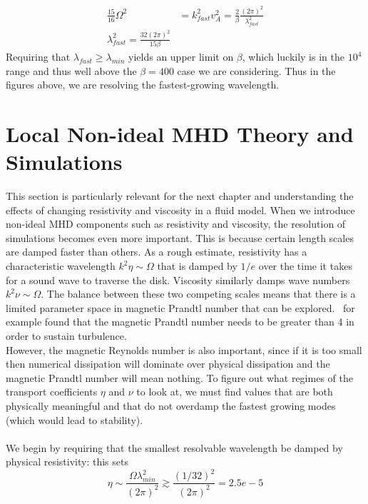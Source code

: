 \begin{align*}
  \frac{15}{16}\Omega^2&=k^2_{fast}v_A^2=\frac2\beta\frac{(2\pi)^2}{\lambda_{fast}^2}\\
  \lambda_{fast}^2=\frac{32(2\pi)^2}{15\beta}
\end{align*}
Requiring that $\lambda_{fast}\ge\lambda_{min}$ yields an upper limit on $\beta$, which luckily is in the $10^4$ range and thus well above the $\beta=400$ case we are considering. Thus in the figures above, we are resolving the fastest-growing wavelength.


\section{Local Non-ideal MHD Theory and Simulations}
 This section is particularly relevant for the next chapter and understanding the effects of changing resistivity and viscosity in a fluid model. When we introduce non-ideal MHD components such as resistivity and viscosity, the resolution of simulations becomes even more important. This is because certain length scales are damped faster than others. As a rough estimate, resistivity has a characteristic wavelength $k^2\eta\sim\Omega$ that is damped by $1/e$ over the time it takes for a sound wave to traverse the disk. Viscosity similarly damps wave numbers $k^2\nu\sim\Omega$. The balance between these two competing scales means that there is a limited parameter space in magnetic Prandtl number that can be explored.~\citet{Fromang2007} for example found that the magnetic Prandtl number needs to be greater than 4 in order to sustain turbulence.
\\
However, the magnetic Reynolds number is also important, since if it is too small then numerical dissipation will dominate over physical dissipation and the magnetic Prandtl number will mean nothing. To figure out what regimes of the transport coefficients $\eta$ and $\nu$ to look at, we must find values that are both physically meaningful and that do not overdamp the fastest growing modes (which would lead to stability). \\
\\
We begin by requiring that the smallest resolvable wavelength be damped by physical resistivity: this sets
\begin{equation*}
  \eta\sim\frac{\Omega\lambda_{min}^2}{(2\pi)^2}\gtrsim\frac{(1/32)^2}{(2\pi)^2}=2.5e-5
\end{equation*}

